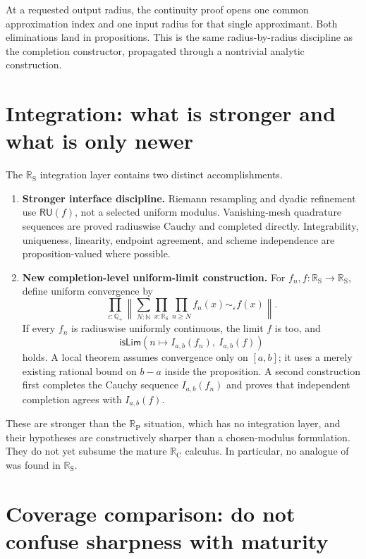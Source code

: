 \documentclass[11pt,a4paper]{article}
\newcommand{\N}{\mathbb{N}}
\newcommand{\Qp}{\mathbb{Q}_{+}}
\newcommand{\RC}{\mathbb{R}_{\mathrm C}}
\newcommand{\RP}{\mathbb{R}_{\mathrm P}}
\newcommand{\RS}{\mathbb{R}_{\mathrm S}}
\newcommand{\brck}[1]{\left\lVert #1\right\rVert}
\newcommand{\prd}[2]{\prod_{#1} #2}
\newcommand{\sm}[2]{\sum_{#1} #2}
\newcommand{\close}[1]{\mathrel{\sim_{#1}}}
\newcommand{\RU}{\mathsf{RU}}
\begin{document}
At a requested output radius, the continuity proof opens one common approximation index and
one input radius for that single approximant.  Both eliminations land in propositions.  This
is the same radius-by-radius discipline as the completion constructor, propagated through a
nontrivial analytic construction.

\section{Integration: what is stronger and what is only newer}

The $\RS$ integration layer contains two distinct accomplishments.

\begin{enumerate}
\item \textbf{Stronger interface discipline.}  Riemann resampling and dyadic refinement use
  $\RU(f)$, not a selected uniform modulus.  Vanishing-mesh quadrature sequences are proved
  radiuswise Cauchy and completed directly.  Integrability, uniqueness, linearity, endpoint
  agreement, and scheme independence are proposition-valued where possible.

\item \textbf{New completion-level uniform-limit construction.}  For
  $f_n,f:\RS\to\RS$, define uniform convergence by
  \[
    \prd{\varepsilon:\Qp}\brck{\sm{N:\N}
      \prd{x:\RS}\prd{n\ge N}f_n(x)\close{\varepsilon}f(x)}.
  \]
  If every $f_n$ is radiuswise uniformly continuous, the limit $f$ is too, and
  \[
    \mathsf{isLim}\!\left(
      n\mapsto I_{a,b}(f_n),\ I_{a,b}(f)\right)
  \]
  holds.  A local theorem assumes convergence only on $[a,b]$; it uses a merely existing
  rational bound on $b-a$ inside the proposition.  A second construction first completes
  the Cauchy sequence $I_{a,b}(f_n)$ and proves that independent completion agrees with
  $I_{a,b}(f)$.
\end{enumerate}

These are stronger than the $\RP$ situation, which has no integration layer, and their
hypotheses are constructively sharper than a chosen-modulus formulation.  They do not yet
subsume the mature $\RC$ calculus.  In particular, no analogue of
 was found in $\RS$.

\section{Coverage comparison: do not confuse sharpness with maturity}
\end{document}
